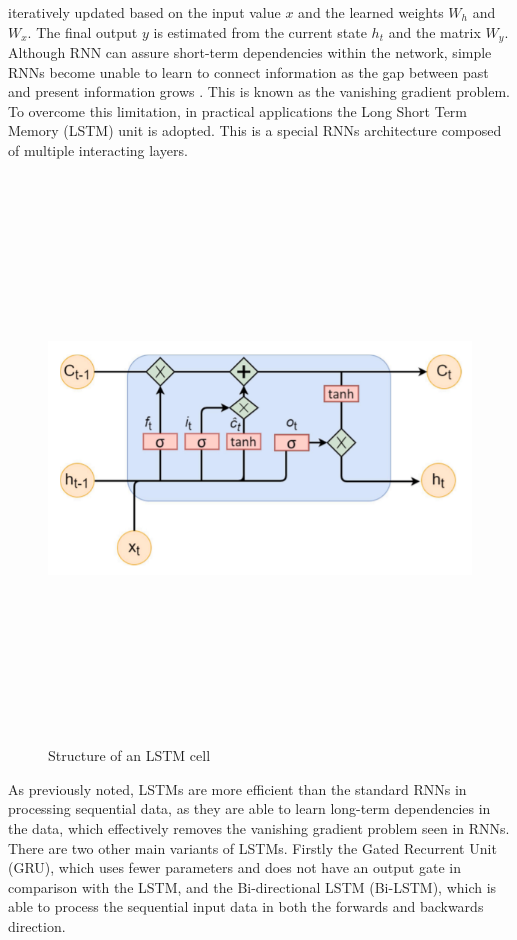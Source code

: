 iteratively updated based on the input value $x$ and the learned weights $W_h$  
and $W_x$. The final output $y$  is estimated from the current state $h_t$  
and the matrix $W_y$. Although RNN can assure short-term dependencies within 
the network, simple RNNs become unable to learn to connect information as the 
gap between past and present information grows \cite{lstm}. This is known as the vanishing gradient problem. To overcome this 
limitation, in practical applications the Long Short Term Memory (LSTM) unit is adopted. This is a special 
RNNs architecture composed of multiple interacting layers.
\begin{figure}[H]
    \centering
    \includegraphics[width=15cm,height=15cm,keepaspectratio]{Background/rnn3.png}
    \caption{Structure of an LSTM cell \cite{ElHajj2021}}
    \label{rnn3}
\end{figure}\noindent As previously noted, LSTMs are more efficient than the standard RNNs 
in processing sequential data, as they are able to learn long-term dependencies in the data, which 
effectively removes the vanishing gradient problem seen in RNNs. There are two other main variants of LSTMs. Firstly the Gated Recurrent Unit (GRU), which uses fewer parameters and does not have an output gate in comparison 
with the LSTM, and the Bi-directional LSTM (Bi-LSTM), which is able to process the sequential input data in both the forwards and backwards direction.

